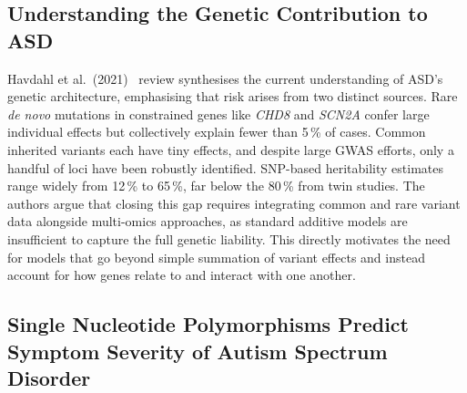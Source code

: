 \subsection{Understanding the Genetic Contribution to ASD}

Havdahl et al.\ (2021)~\cite{havdahl2021} review synthesises the
current understanding of ASD's genetic architecture, emphasising that
risk arises from two distinct sources. Rare \textit{de novo} mutations
in constrained genes like \textit{CHD8} and \textit{SCN2A} confer large
individual effects but collectively explain fewer than 5\,\% of
cases. Common inherited variants each have tiny effects, and despite
large GWAS efforts, only a handful of loci have been robustly
identified. SNP-based heritability estimates range widely from 12\,\%
to 65\,\%, far below the 80\,\% from twin studies. The authors argue
that closing this gap requires integrating common and rare variant
data alongside multi-omics approaches, as standard additive models are
insufficient to capture the full genetic liability. This directly
motivates the need for models that go beyond simple summation of
variant effects and instead account for how genes relate to and
interact with one another.

\subsection{Single Nucleotide Polymorphisms Predict Symptom Severity of Autism Spectrum Disorder}


